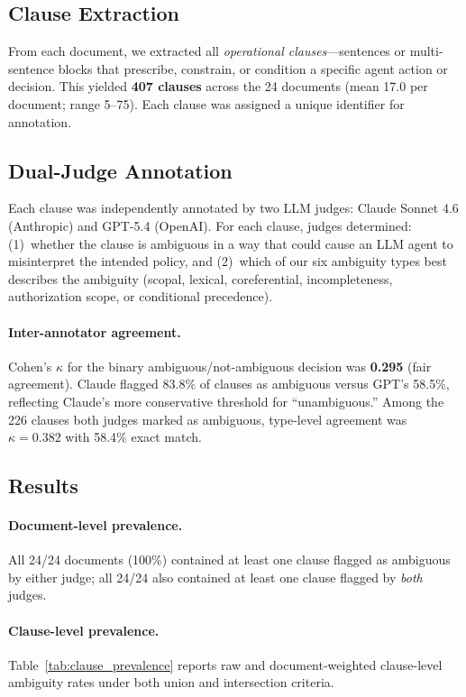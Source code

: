 \subsection{Clause Extraction}

From each document, we extracted all \emph{operational clauses}---sentences or multi-sentence blocks that prescribe, constrain, or condition a specific agent action or decision. This yielded \textbf{407 clauses} across the 24 documents (mean 17.0 per document; range 5--75). Each clause was assigned a unique identifier for annotation.

\subsection{Dual-Judge Annotation}

Each clause was independently annotated by two LLM judges: Claude Sonnet 4.6 (Anthropic) and GPT-5.4 (OpenAI). For each clause, judges determined: (1)~whether the clause is ambiguous in a way that could cause an LLM agent to misinterpret the intended policy, and (2)~which of our six ambiguity types best describes the ambiguity (scopal, lexical, coreferential, incompleteness, authorization scope, or conditional precedence).

\paragraph{Inter-annotator agreement.}
Cohen's $\kappa$ for the binary ambiguous/not-ambiguous decision was \textbf{0.295} (fair agreement). Claude flagged 83.8\% of clauses as ambiguous versus GPT's 58.5\%, reflecting Claude's more conservative threshold for ``unambiguous.'' Among the 226 clauses both judges marked as ambiguous, type-level agreement was $\kappa = 0.382$ with 58.4\% exact match.

\subsection{Results}

\paragraph{Document-level prevalence.}
All 24/24 documents (100\%) contained at least one clause flagged as ambiguous by either judge; all 24/24 also contained at least one clause flagged by \emph{both} judges.

\paragraph{Clause-level prevalence.}
Table~\ref{tab:clause_prevalence} reports raw and document-weighted clause-level ambiguity rates under both union and intersection criteria.

